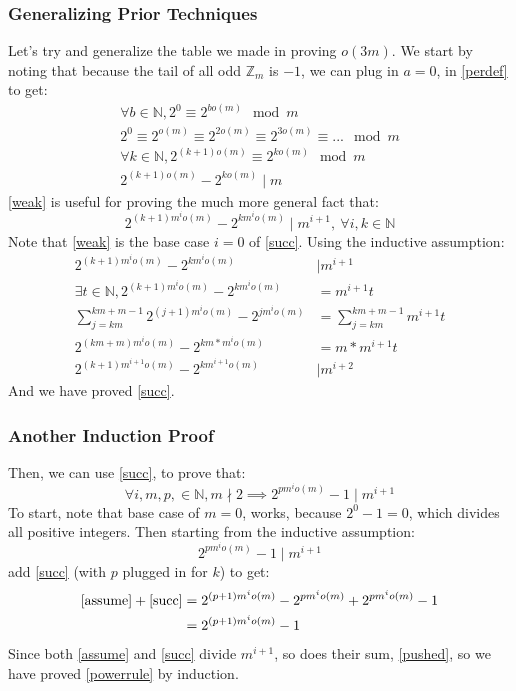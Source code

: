 \documentclass{article}
\begin{document}
  \subsubsection{Generalizing Prior Techniques}
  Let's try and generalize the table we made in proving $o(3m)$. We start by noting that because the tail of all odd $\mathbb{Z}_m$ is $-1$, we can plug in $a=0$, in  \eqref{perdef} to get:
  \begin{align}
    \forall b \in \mathbb{N}, 2^{0} \equiv 2^{bo(m)} \mod m\\
    2^0 \equiv 2^{o(m)} \equiv 2^{2o(m)}\equiv 2^{3o(m)} \equiv ... \mod m\\
    \forall k \in \mathbb{N}, 2^{(k+1)o(m)} \equiv 2^{ko(m)} \mod m\\
    2^{(k+1)o(m)} - 2^{ko(m)} \mid m \label{weak}
  \end{align}
  \eqref{weak} is useful for proving the much more general fact that:
  \begin{equation}\label{succ}
    2^{(k+1)m^io(m)} - 2^{km^io(m)} \mid m^{i+1},\  \forall i, k \in \mathbb{N}
  \end{equation}
  Note that \eqref{weak} is the base case $i=0$ of \eqref{succ}. Using the inductive assumption:
  \begin{align}
    2^{(k+1)m^io(m)} - 2^{km^io(m)} &\mid m^{i+1}\\
    \exists t \in \mathbb{N}, 2^{(k+1)m^io(m)} - 2^{km^io(m)} &= m^{i+1}t\\
    \sum^{km+m-1}_{j=km}2^{(j+1)m^io(m)} - 2^{jm^io(m)} &= \sum^{km+m-1}_{j=km}m^{i+1}t\\
    2^{(km+m)m^io(m)} - 2^{km*m^{i}o(m)} &= m * m^{i+1}t\\
    2^{(k+1)m^{i+1}o(m)} - 2^{km^{i+1}o(m)} &\mid  m^{i+2}
  \end{align}
  And we have proved \eqref{succ}.
  \subsubsection{Another Induction Proof}
  Then, we can use \eqref{succ}, to prove that:
  \begin{equation}\label{powerrule}
    \forall i, m ,p, \in \mathbb{N}, m \nmid 2 \implies 2^{pm^{i}o(m)} - 1 \mid m^{i+1}
  \end{equation}
  To start, note that base case of $m=0$, works, because $2^0 - 1 = 0$, which divides all positive integers. Then starting from the inductive assumption:
  \begin{equation}\label{assume}
    2^{pm^io(m)} - 1 \mid m^{i+1}
  \end{equation}
  add \eqref{succ} (with $p$ plugged in for $k$) to get:
  \begin{align}
    \eqref{assume} + \eqref{succ} &= 2^{(p+1)m^io(m)} - 2^{pm^io(m)} +2^{pm^io(m)} - 1\\
    &= 2^{(p+1)m^io(m)} - 1 \label{pushed}
  \end{align}
  Since both \eqref{assume} and \eqref{succ} divide $m^{i+1}$, so does their sum, \eqref{pushed}, so we have proved \eqref{powerrule} by induction.
\end{document}

